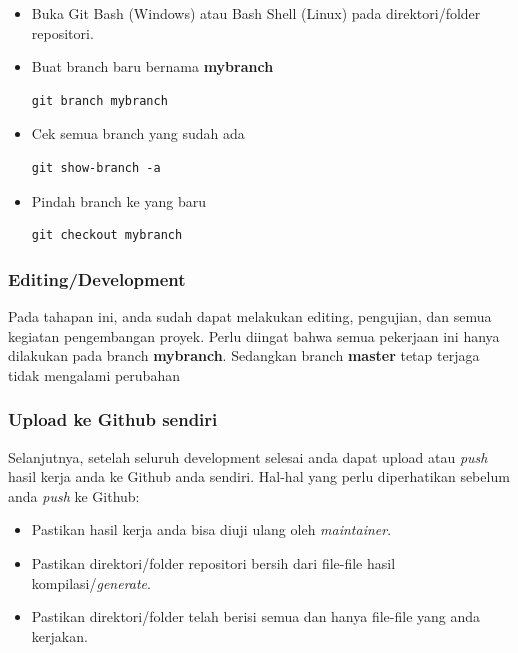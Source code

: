 \documentclass[12pt]{article}
\begin{document}
	\begin{itemize}
		\item Buka Git Bash (Windows) atau Bash Shell (Linux) pada direktori/folder repositori.
		
		\item Buat branch baru bernama \textbf{mybranch}
		\begin{verbatim}
git branch mybranch
		\end{verbatim}
		
		\item Cek semua branch yang sudah ada
		\begin{verbatim}
git show-branch -a
		\end{verbatim}
		
		\item Pindah branch ke yang baru
		\begin{verbatim}
git checkout mybranch
		\end{verbatim}
		
	\end{itemize} 

	\subsubsection{Editing/Development}	
	
	Pada tahapan ini, anda sudah dapat melakukan editing, pengujian, dan semua kegiatan pengembangan proyek.
	Perlu diingat bahwa semua pekerjaan ini hanya dilakukan pada branch \textbf{mybranch}.
	Sedangkan branch \textbf{master} tetap terjaga tidak mengalami perubahan
	
	\subsubsection{Upload ke Github sendiri}
	 
	Selanjutnya, setelah seluruh development selesai anda dapat upload atau \textit{push} hasil kerja anda ke Github anda sendiri.
	Hal-hal yang perlu diperhatikan sebelum anda \textit{push} ke Github:
	
	\begin{itemize}
		\item Pastikan hasil kerja anda bisa diuji ulang oleh \textit{maintainer}.
		\item Pastikan direktori/folder repositori bersih dari file-file hasil kompilasi/\textit{generate}.
		\item Pastikan direktori/folder telah berisi semua dan hanya file-file yang anda kerjakan.
	\end{itemize} 
\end{document}
